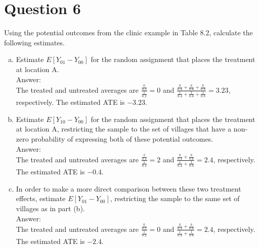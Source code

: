 \documentclass[11pt,notitlepage]{article}\usepackage[]{graphicx}\usepackage[]{color}
\begin{document}
\section*{Question 6}
Using the potential outcomes from the clinic example in Table 8.2, calculate the following estimates.
\begin{enumerate}[a)]
\item Estimate $E[Y_{01} - Y_{00}]$ for the random assignment that places the treatment at location A. \\
Answer:\\
The treated and untreated averages are $\frac{\frac{0}{0.2}}{\frac{1}{0.2}} =0$ and $\frac{\frac{0}{0.4}+\frac{6}{0.6}+\frac{6}{0.8}}{\frac{1}{0.4}+\frac{1}{0.6}+\frac{1}{0.8}} = 3.23$, respectively.  The estimated ATE is $-3.23$.
\item Estimate $E[Y_{10} - Y_{00}]$ for the random assignment that places the treatment at location A, restricting the sample to the set of villages that have a non-zero probability of expressing both of these potential outcomes.\\
Answer:\\
The treated and untreated averages are $\frac{\frac{2}{0.4}}{\frac{1}{0.4}} =2$ and $\frac{\frac{0}{0.4}+\frac{6}{0.6}}{\frac{1}{0.4}+\frac{1}{0.6}} = 2.4$, respectively.  The estimated ATE is $-0.4$.
\item In order to make a more direct comparison between these two treatment effects, estimate $E[Y_{01} - Y_{00}]$, restricting the sample to the same set of villages as in part (b).\\
Answer:\\
The treated and untreated averages are $\frac{\frac{0}{0.2}}{\frac{1}{0.2}} =0$ and $\frac{\frac{0}{0.4}+\frac{6}{0.6}}{\frac{1}{0.4}+\frac{1}{0.6}} = 2.4$, respectively.  The estimated ATE is $-2.4$.
\end{enumerate}
\end{document}
